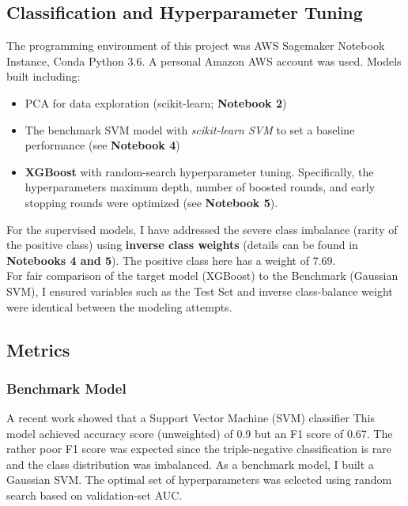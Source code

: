 \documentclass[11pt]{diazessay}
\begin{document}
\subsection{Classification and Hyperparameter Tuning}

The programming environment of this project was AWS Sagemaker Notebook Instance, Conda Python 3.6. A personal Amazon AWS account was used. Models built including:

\begin{itemize}
	\item PCA for data exploration (scikit-learn; \textbf{Notebook 2})
	\item The benchmark SVM model with \textit{scikit-learn SVM} to set a baseline performance (see \textbf{Notebook 4})
	\item \textbf{XGBoost} with random-search hyperparameter tuning. Specifically, the hyperparameters maximum depth, number of boosted rounds, and early stopping rounds were optimized (see \textbf{Notebook 5}).
\end{itemize}

For the supervised models, I have addressed the severe class imbalance (rarity of the positive class) using \textbf{inverse class weights} (details can be found in \textbf{Notebooks 4 and 5}). The positive class here has a weight of $7.69$. \\

For fair comparison of the target model (XGBoost) to the Benchmark (Gaussian SVM), I ensured variables such as the Test Set and inverse class-balance weight were identical between the modeling attempts.

\subsection{Metrics}

\subsubsection{Benchmark Model}

A recent work \cite{wu2021} showed that a Support Vector Machine (SVM) classifier This model achieved accuracy score (unweighted) of 0.9 but an F1 score of 0.67. The rather poor F1 score was expected since the triple-negative classification is rare and the class distribution was imbalanced. As a benchmark model, I built a Gaussian SVM. The optimal set of hyperparameters was selected using random search based on validation-set AUC.
\end{document}
